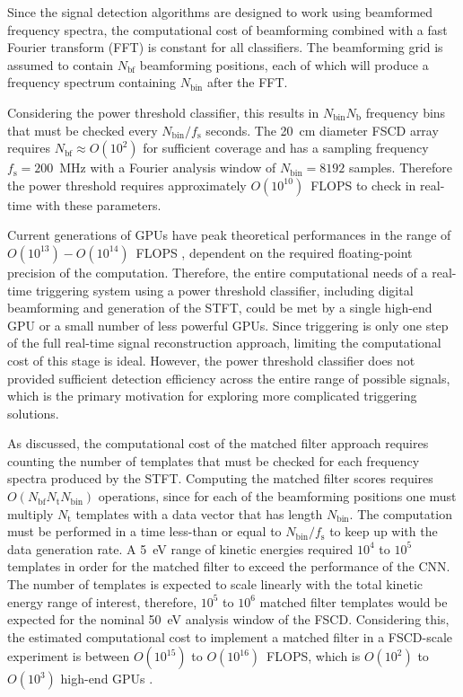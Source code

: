 Since the signal detection algorithms are designed to work using beamformed frequency spectra, the computational cost of beamforming combined with a fast Fourier transform (FFT) is constant for all classifiers. The beamforming grid is assumed to contain $N_\mathrm{bf}$ beamforming positions, each of which will produce a frequency spectrum containing $N_\mathrm{bin}$ after the FFT. 

Considering the power threshold classifier, this results in $N_\mathrm{bin}N_\mathrm{b}$ frequency bins that must be checked every $N_\mathrm{bin}/f_\mathrm{s}$ seconds. The 20~cm diameter FSCD array requires $N_\mathrm{bf}\approx O(10^2)$ for sufficient coverage and has a sampling frequency $f_\mathrm{s}=200$~MHz with a Fourier analysis window of $N_\mathrm{bin}=8192$ samples. Therefore the power threshold requires approximately $O(10^{10})$~FLOPS to check in real-time with these parameters.

Current generations of GPUs have peak theoretical performances in the range of $O(10^{13})-O(10^{14})$~FLOPS \cite{h100}, dependent on the required floating-point precision of the computation. Therefore, the entire computational needs of a real-time triggering system using a power threshold classifier, including digital beamforming and generation of the STFT, could be met by a single high-end GPU or a small number of less powerful GPUs. Since triggering is only one step of the full real-time signal reconstruction approach, limiting the computational cost of this stage is ideal. However, the power threshold classifier does not provided sufficient detection efficiency across the entire range of possible signals, which is the primary motivation for exploring more complicated triggering solutions. 

As discussed, the computational cost of the matched filter approach requires counting the number of templates that must be checked for each frequency spectra produced by the STFT. Computing the matched filter scores requires $O(N_\mathrm{bf}N_\mathrm{t}N_\mathrm{bin})$ operations, since for each of the beamforming positions one must multiply $N_\mathrm{t}$ templates with a data vector that has length $N_\mathrm{bin}$. The computation must be performed in a time less-than or equal to $N_\mathrm{bin}/f_\mathrm{s}$ to keep up with the data generation rate. A 5~eV range of kinetic energies required $10^4$ to $10^5$ templates in order for the matched filter to exceed the performance of the CNN. The number of templates is expected to scale linearly with the total kinetic energy range of interest, therefore, $10^5$ to $10^6$ matched filter templates would be expected for the nominal 50~eV analysis window of the FSCD. Considering this, the estimated computational cost to implement a matched filter in a FSCD-scale experiment is between $O(10^{15})$ to $O(10^{16})$~FLOPS, which is $O(10^2)$ to $O(10^3)$ high-end GPUs .

